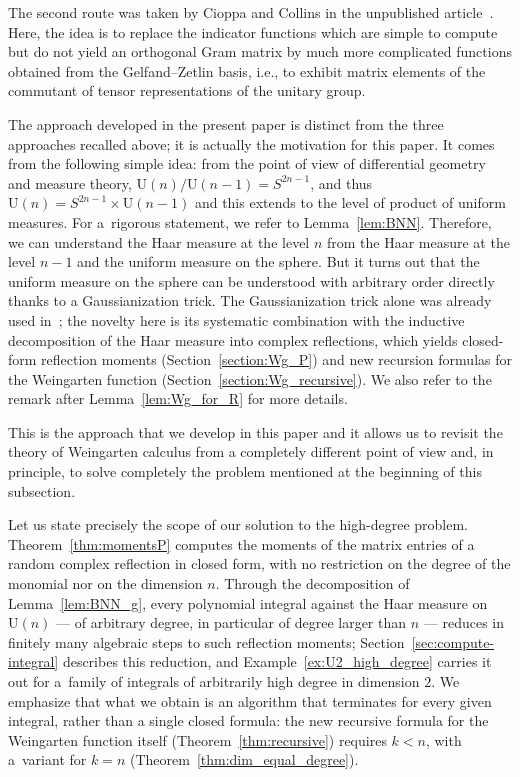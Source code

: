 \documentclass[10pt,a4paper]{amsart}
\numberwithin{equation}{section}
\theoremstyle{definition}
\newcommand{\UU}{\mathrm{U}}
\begin{document}
The second route was taken by Cioppa and Collins in the
unpublished article~\cite{CioppaCollins}.
Here, the idea is to replace the indicator functions which are simple to compute but do not yield an orthogonal Gram matrix by much more complicated functions obtained from the Gelfand--Zetlin basis, i.e., to exhibit matrix elements of the commutant of tensor representations of the unitary group.

The approach developed in the present paper is distinct from the three approaches recalled above; it is actually the motivation for this paper. It comes from the following simple idea: from the point of view of differential geometry and measure theory,
$\UU(n)/\UU(n-1)=S^{2n-1}$, and thus
 $\UU(n)=S^{2n-1}\times \UU(n-1)$
 and this extends to the level of product of uniform measures.
 For a~rigorous statement, we refer to Lemma~\ref{lem:BNN}.
 Therefore, we can understand the Haar measure at the level $n$ from the Haar measure at the level $n-1$ and the uniform measure on the sphere. But it turns out that the uniform measure on the sphere can be understood with arbitrary order directly thanks to a Gaussianization trick.
 The Gaussianization trick alone was already used in~\cite{BanicaCollins2008}; the novelty here is its systematic combination with the inductive decomposition of the Haar measure into complex reflections, which yields closed-form reflection moments (Section~\ref{section:Wg_P}) and new recursion formulas for the Weingarten function (Section~\ref{section:Wg_recursive}). We also refer to the remark after Lemma~\ref{lem:Wg_for_R} for more details.


 This is the approach that we develop in this paper and it allows us to revisit the theory of Weingarten calculus from a completely different point of view
 and, in principle, to solve completely the problem mentioned at the beginning of this subsection.

Let us state precisely the scope of our solution to the high-degree problem.
Theorem~\ref{thm:momentsP} computes the moments of the matrix entries of a random complex reflection in closed form, with no restriction on the degree of the monomial nor on the dimension $n$.
Through the decomposition of Lemma~\ref{lem:BNN_g}, every polynomial integral against the Haar measure on $\UU(n)$ --- of arbitrary degree, in particular of degree larger than $n$ --- reduces in finitely many algebraic steps to such reflection moments; Section~\ref{sec:compute-integral} describes this reduction, and Example~\ref{ex:U2_high_degree} carries it out for a~family of integrals of arbitrarily high degree in dimension $2$.
We emphasize that what we obtain is an algorithm that terminates for every given integral, rather than a single closed formula: the new recursive formula for the Weingarten function itself (Theorem~\ref{thm:recursive}) requires $k<n$, with a~variant for $k=n$ (Theorem~\ref{thm:dim_equal_degree}).
\end{document}
